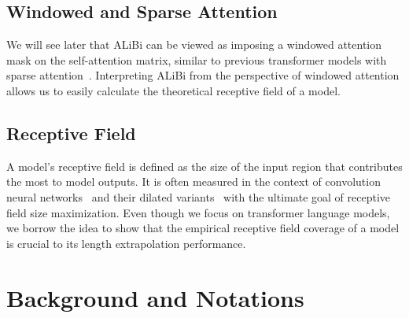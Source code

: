 \documentclass[11pt]{article}
\theoremstyle{plain}
\begin{document}
\subsection{Windowed and Sparse Attention}
We will see later that ALiBi can be viewed as imposing a windowed attention mask on the self-attention matrix, similar to previous transformer models with sparse attention~\cite{beltagy2020longformer,bigbird,etc,gmat}. 
Interpreting ALiBi from the perspective of windowed attention allows us to easily calculate the theoretical receptive field of a model.

\subsection{Receptive Field}
A model's receptive field is defined as the size of the input region that contributes the most to model outputs. It is often measured in the context of convolution neural networks~\cite{receptive, deformable,araujo2019computing,raghu2021do,dosovitskiy2021an} and their dilated variants~\cite{oord2016wavenet, dilated_conv,dilated_rnn, beltagy2020longformer} with the ultimate goal of receptive field size maximization. 
Even though we focus on transformer language models, we borrow the idea to show that the empirical receptive field coverage of a model is crucial to its length extrapolation performance.

\section{Background and Notations}
\end{document}
